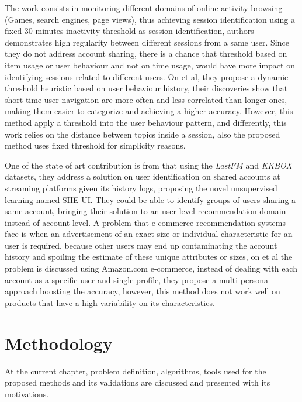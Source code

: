 \documentclass[ecp,tc,english]{iiufrgs}
\begin{document}
The work \cite{10.1145/2736277.2741117} consists in monitoring different domains of online activity browsing (Games, search engines, page views), thus achieving session identification using a fixed 30 minutes inactivity threshold as session identification, authors demonstrates high regularity between different sessions from a same user. 
Since they do not address account sharing, there is a chance that threshold based on item usage or user behaviour and not on time usage, would have more impact on identifying sessions related to different users.
On \cite{JINDAL2020} et al, they propose a dynamic threshold heuristic based on user behaviour history, their discoveries show that short time user navigation are more often and less correlated than longer ones, making them easier to categorize and achieving a higher accuracy. However, this method apply a threshold into the user behaviour pattern, and differently, this work relies on the distance between topics inside a session, also the proposed method uses fixed threshold for simplicity reasons.

One of the state of art contribution is from \cite{Jiang:2018:IUB:3209978.3210054} that using the \textit{LastFM} and \textit{KKBOX} datasets, they address a solution on user identification on shared accounts at streaming platforms given its history logs, proposing the novel unsupervised learning named SHE-UI. They could be able to identify groups of users sharing a same account, bringing their solution to an user-level recommendation domain instead of account-level.
A problem that e-commerce recommendation systems face is when an advertisement of an exact size or individual characteristic for an user is required, because other users may end up contaminating the account history and spoiling the estimate of these unique attributes or sizes, on \cite{10.1145/3178876.3186149} et al the problem is discussed using Amazon.com e-commerce, instead of dealing with each account as a specific user and single profile, they propose a multi-persona approach boosting the accuracy, however, this method does not work well on products that have a high variability on its characteristics.

\cite{DBLP:journals/corr/ZhangFIM14}
\cite{10.1145/2792838.2800170}



\chapter{Methodology}
At the current chapter, problem definition, algorithms, tools used for the proposed methods and its validations are discussed and presented with its motivations.
\end{document}
